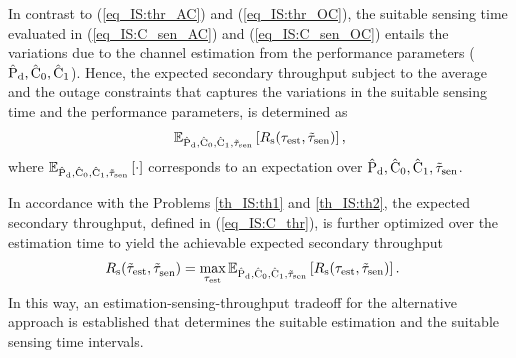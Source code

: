 \begin{corollary} \label{cor_IS:cor1}
\normalfont
{}
In contrast to (\ref{eq_IS:thr_AC}) and (\ref{eq_IS:thr_OC}), the suitable sensing time evaluated in (\ref{eq_IS:C_sen_AC}) and (\ref{eq_IS:C_sen_OC}) entails the variations due to the channel estimation from the performance parameters ($\hat{\text{P}}_{\text{d}}, \hat{\text{C}}_{\text{0}}, \hat{\text{C}}_{\text{1}}$). Hence, the expected secondary throughput subject to the average and the outage constraints that captures the variations in the suitable sensing time and the performance parameters, is determined as
\begin{align}
\e{\epd, \ecz, \eco, \ttsen}{\rs(\test, \ttsen)} \label{eq_IS:C_thr},
\end{align}
where ${\mathbb E}_{\hat{\text{P}}_{\text{d}}, \hat{\text{C}}_{\text{0}}, \hat{\text{C}}_{\text{1}}, \tilde{\tau}_{\text{sen}}}\left[ \cdot \right]$ corresponds to an expectation over $\hat{\text{P}}_{\text{d}}, \hat{\text{C}}_{\text{0}}, \hat{\text{C}}_{\text{1}}, \tilde{\tau}_{\text{sen}}$.

In accordance with the Problems  \ref{th_IS:th1} and \ref{th_IS:th2}, the expected secondary throughput, defined in (\ref{eq_IS:C_thr}), is further optimized over the estimation time to yield the achievable expected secondary throughput
\begin{align}
\trs(\ttest, \ttsenac) &= \maxi_{\test} \e{\epd, \ecz, \eco, \ttsen}{\rs(\test, \ttsen)} \label{eq_IS:C_thr_AC}. 
\end{align}
In this way, an estimation-sensing-throughput tradeoff for the alternative approach is established that determines the suitable estimation and the suitable sensing time intervals.
\end{corollary}
